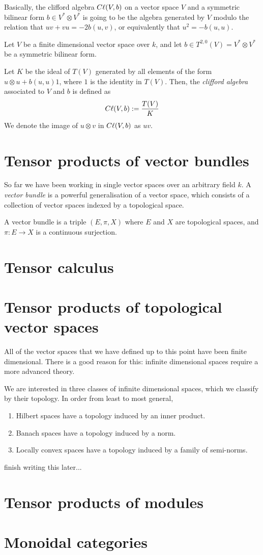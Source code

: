 \documentclass{owmaths}
\begin{document}
Basically, the clifford algebra $C\ell(V,b)$
on a vector space $V$ and a symmetric bilinear form $b \in V^* \otimes V^*$
is going to be the algebra generated by $V$ modulo the relation
that $uv+vu = -2b(u,v)$, or equivalently that $u^2 = -b(u,u)$. 
\begin{definition}
    Let $V$ be a finite dimensional vector space over $k$, and 
    let $b \in T^{2,0}(V) = V^* \otimes V^*$ be a symmetric bilinear form.
    
    Let $K$ be the ideal of $T(V)$ generated by all elements
    of the form $u\otimes u + b(u,u)1$, where $1$ is the identity
    in $T(V)$. Then, the \emph{clifford algebra} associated to
    $V$ and $b$ is defined as
    \begin{equation*}
        C\ell(V,b) := \frac{T(V)}{K}
    \end{equation*}
    We denote the image of $u \otimes v$ in $C\ell(V,b)$ as $uv$.
\end{definition}


\section{Tensor products of vector bundles}
So far we have been working in single vector spaces
over an arbitrary field $k$. A \emph{vector bundle} is a powerful
generalisation of a vector space, which consists of a collection
of vector spaces indexed by a topological space. 
\begin{definition}
    A vector bundle is a triple $(E,\pi,X)$ where $E$
    and $X$ are topological spaces, and $\pi:E\rightarrow X$
    is a continuous surjection.
\end{definition}

\section{Tensor calculus}

\section{Tensor products of topological vector spaces}
All of the vector spaces that we have defined up to this point
have been finite dimensional. There is a good reason for this:
infinite dimensional spaces require a more advanced theory.

We are interested in three classes of infinite dimensional
spaces, which we classify by their topology. In order from
least to most general,
\begin{enumerate}
\item{} Hilbert spaces have a topology induced by an inner product.
\item{} Banach spaces have a topology induced by a norm.
\item{} Locally convex spaces have a topology induced by a family of semi-norms.
\end{enumerate}
finish writing this later...
\section{Tensor products of modules}    

    
    
\section{Monoidal categories}
\end{document}
